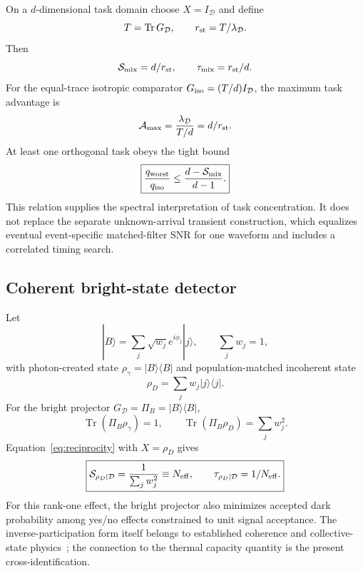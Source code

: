 \documentclass[aps,twocolumn,superscriptaddress,longbibliography]{revtex4-2}
\newcommand{\Tr}{\operatorname{Tr}}
\newcommand{\cD}{\mathcal D}
\newcommand{\cS}{\mathcal S}
\begin{document}
On a $d$-dimensional task domain choose $X=I_{\cD}$ and define
\begin{equation}
T=\Tr G_{\cD},
\qquad
r_{\rm st}=T/\lambda_{\cD}.
\end{equation}
Then
\begin{equation}
\cS_{\rm mix}=d/r_{\rm st},
\qquad
\tau_{\rm mix}=r_{\rm st}/d.
\end{equation}
For the equal-trace isotropic comparator $G_{\rm iso}=(T/d)I_{\cD}$, the maximum task advantage is
\begin{equation}
\mathcal A_{\max}=\frac{\lambda_{\cD}}{T/d}=d/r_{\rm st}.
\end{equation}
At least one orthogonal task obeys the tight bound
\begin{equation}
\boxed{
\frac{q_{\rm worst}}{q_{\rm iso}}\le
\frac{d-\cS_{\rm mix}}{d-1}.}
\label{eq:task-penalty}
\end{equation}
This relation supplies the spectral interpretation of task concentration. It does not replace the separate unknown-arrival transient construction, which equalizes eventual event-specific matched-filter SNR for one waveform and includes a correlated timing search.

\subsection{Coherent bright-state detector}

Let
\begin{equation}
|B\rangle=\sum_j\sqrt{w_j}e^{i\phi_j}|j\rangle,
\qquad \sum_jw_j=1,
\end{equation}
with photon-created state $\rho_\gamma=|B\rangle\langle B|$ and population-matched incoherent state
\begin{equation}
\rho_D=\sum_jw_j|j\rangle\langle j|.
\end{equation}
For the bright projector $G_{\cD}=\Pi_B=|B\rangle\langle B|$,
\begin{equation}
\Tr(\Pi_B\rho_\gamma)=1,
\qquad
\Tr(\Pi_B\rho_D)=\sum_jw_j^2.
\end{equation}
Equation~\eqref{eq:reciprocity} with $X=\rho_D$ gives
\begin{equation}
\boxed{
\cS_{\rho_D|\cD}=\frac{1}{\sum_jw_j^2}\equiv N_{\rm eff},
\qquad
\tau_{\rho_D|\cD}=1/N_{\rm eff}.}
\label{eq:neff}
\end{equation}
For this rank-one effect, the bright projector also minimizes accepted dark probability among yes/no effects constrained to unit signal acceptance. The inverse-participation form itself belongs to established coherence and collective-state physics~\cite{Helstrom1976,Dicke1954,Scully2009}; the connection to the thermal capacity quantity is the present cross-identification.
\end{document}
